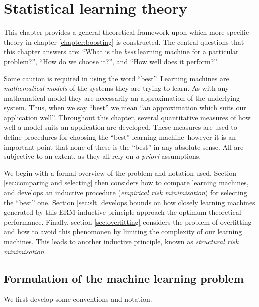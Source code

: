 
\chapter{Statistical learning theory}
\label{chapter:slt}

This chapter provides a general theoretical framework upon which more
specific theory in chapter \ref{chapter:boosting} is constructed.  The
central questions that this chapter answers are: ``What is the
\emph{best} learning machine for a particular problem?'', ``How do we
choose it?'', and ``How well does it perform?''.

Some caution is required in using the word ``best''.  Learning
machines are \emph{mathematical models} of the systems they are trying
to learn.  As with any mathematical model they are necessarily an
approximation of the underlying system.  Thus, when we say
``best'' we mean ``an approximation which suits our application
well''.  Throughout this chapter, several quantitative
measures of how well a model suits an application are developed.
These measures are used to define procedures for choosing the ``best''
learning machine--however it is an important point that none of
these is the ``best'' in any absolute sense.  All are subjective to an
extent, as they all rely on \emph{a priori} assumptions.

We begin with a formal overview of the problem and notation used.
Section \ref{sec:comparing and selecting} then considers how to
compare learning machines, and develops an inductive procedure
(\emph{empirical risk minimisation}) for selecting the ``best'' one.
Section \ref{sec:slt} develops bounds on how closely learning machines
generated by this ERM inductive principle approach the optimum
theoretical performance.  Finally, section \ref{sec:overfitting}
considers the problem of overfitting and how to avoid this phenomonen
by limiting the complexity of our learning machines.  This leads to
another inductive principle, known as \emph{structural risk
minimisation}.


\section{Formulation of the machine learning problem}
\label{sec:formulation}

We first develop some conventions and notation.

